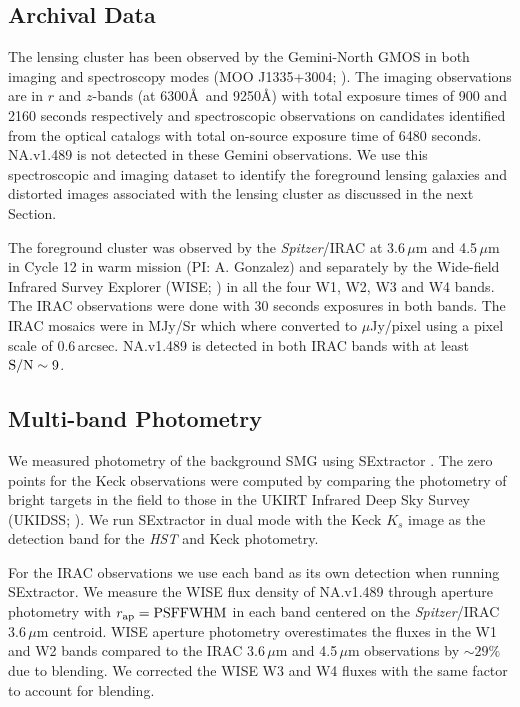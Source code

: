 \documentclass[iop,apj,useAMS,usenatbib]{emulateapj-rtx4}
\begin{document}
\subsection {Archival Data}

The lensing cluster has been observed by the Gemini-North GMOS in both
imaging and spectroscopy modes (MOO J1335+3004; \citealp{Stanford2014}). The imaging
observations are in $r$ and $z$-bands (at 6300\AA\ and 9250\AA) with
total exposure times of 900 and 2160 seconds respectively
\citep{Stanford2014} and spectroscopic observations on candidates
identified from the optical catalogs with total
on-source exposure time of 6480 seconds. NA.v1.489 is not detected in these
Gemini observations. We use this spectroscopic and
imaging dataset to identify the foreground lensing galaxies and
distorted images associated with the lensing cluster as discussed in
the next Section. 

The foreground cluster was observed by the {\it Spitzer}/IRAC at
3.6\,$\mu$m and 4.5\,$\mu$m in Cycle 12 in warm mission (PI:
A. Gonzalez) and separately by the Wide-field Infrared Survey Explorer
(WISE; \citealp{Wright2010}) in all the four W1, W2, W3 and W4
bands. The IRAC observations were done with 30 seconds exposures in both
bands. The IRAC mosaics were in MJy/Sr which where converted to
$\mu$Jy/pixel using a pixel scale of 0.6\,arcsec. NA.v1.489 is
detected in both IRAC bands with at least ${\rm S/N}\sim9$.

\subsection {Multi-band Photometry}

We measured photometry of the background SMG using
{\sc SExtractor} \citep{Bertin1996}. The zero points for the Keck
observations were computed by comparing the photometry of bright
targets in the field to those in the UKIRT Infrared Deep Sky Survey (UKIDSS;
\citealp{Lawrence2007}). We run {\sc SExtractor} in dual mode with the Keck
$K_s$ image as the detection band for the {\it HST} and Keck photometry. 

For the IRAC observations we use each band as its own detection when
running {\sc SExtractor}. We measure the WISE flux density of NA.v1.489 through
aperture photometry with $r_{\rm ap}={\rm PSF FWHM}$ in each band
centered on the {\it Spitzer}/IRAC 3.6\,$\mu$m centroid. WISE aperture
photometry overestimates the fluxes in the W1 and W2 bands compared to
the IRAC 3.6\,$\mu$m and 4.5\,$\mu$m observations by $\sim 29\%$ due
to blending. We corrected the WISE W3 and W4 fluxes with the same
factor to account for blending.
\end{document}
